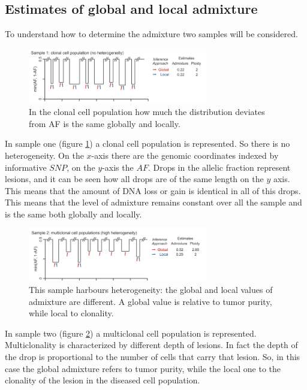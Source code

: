	\subsection{Estimates of global and local admixture}
	To understand how to determine the admixture two samples will be considered.

	\begin{figure}[H]
		\centering
		\includegraphics[width=0.7\textwidth]{sample1.png}
		\caption{In the clonal cell population how much the distribution deviates from AF is the same globally and locally.}
		\label{fig:sample1}
	\end{figure}

	In sample one (figure \ref{fig:sample1}) a clonal cell population is represented.
	So there is no heterogeneity.
	On the $x$-axis there are the genomic coordinates indexed by informative $SNP$, on the $y$-axis the $AF$.
	Drops in the allelic fraction represent lesions, and it can be seen how all drops are of the same length on the $y$ axis.
	This means that the amount of DNA loss or gain is identical in all of this drops.
	This means that the level of admixture remains constant over all the sample and is the same both globally and locally.

	\begin{figure}[H]
		\centering
		\includegraphics[width=0.7\textwidth]{sample2.png}
		\caption{This sample harbours heterogeneity: the global and local values of admixture are different. A global value is relative to tumor purity, while local to clonality.}
		\label{fig:sample2}
	\end{figure}

	In sample two (figure \ref{fig:sample2}) a multiclonal cell population is represented.
	Multiclonality is characterized by different depth of lesions.
	In fact the depth of the drop is proportional to the number of cells that carry that lesion.
	So, in this case the global admixture refers to tumor purity, while the local one to the clonality of the lesion in the diseased cell population.

